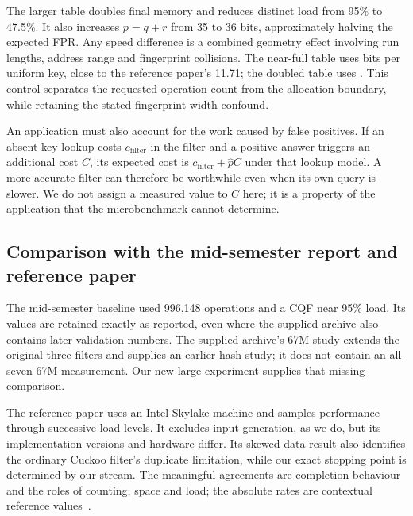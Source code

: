 The larger table doubles final memory and reduces distinct load from 95\% to 47.5\%. It also increases $p=q+r$ from 35 to 36 bits, approximately halving the expected FPR. Any speed difference is a combined geometry effect involving run lengths, address range and fingerprint collisions. The near-full table uses \GeometrySmallBits{} bits per uniform key, close to the reference paper's 11.71; the doubled table uses \GeometryLargeBits{}. This control separates the requested operation count from the allocation boundary, while retaining the stated fingerprint-width confound.

An application must also account for the work caused by false positives. If an absent-key lookup costs $c_{\mathrm{filter}}$ in the filter and a positive answer triggers an additional cost $C$, its expected cost is $c_{\mathrm{filter}}+\hat p C$ under that lookup model. A more accurate filter can therefore be worthwhile even when its own query is slower. We do not assign a measured value to $C$ here; it is a property of the application that the microbenchmark cannot determine.
\clearpage

\subsection{Comparison with the mid-semester report and reference paper}
\begin{table}[!htbp]\centering\small
\caption{Uniform reference context for the original three filters. Insert/positive/negative rates are in M/s. Literature values are from Table~1(a) of Pandey et al.; earlier values are transcribed from the supplied report. Archived 67M values are preserved from the input ZIP; new values are measured in this session. These are separate environments, configurations and protocols, not speedup trials.}
\label{tab:history}

\end{table}

The mid-semester baseline used 996,148 operations and a CQF near 95\% load. Its values are retained exactly as reported, even where the supplied archive also contains later validation numbers. The supplied archive's 67M study extends the original three filters and supplies an earlier hash study; it does not contain an all-seven 67M measurement. Our new large experiment supplies that missing comparison.

The reference paper uses an Intel Skylake machine and samples performance through successive load levels. It excludes input generation, as we do, but its implementation versions and hardware differ. Its skewed-data result also identifies the ordinary Cuckoo filter's duplicate limitation, while our exact stopping point is determined by our stream. The meaningful agreements are completion behaviour and the roles of counting, space and load; the absolute rates are contextual reference values~\cite{pandey2017}.


